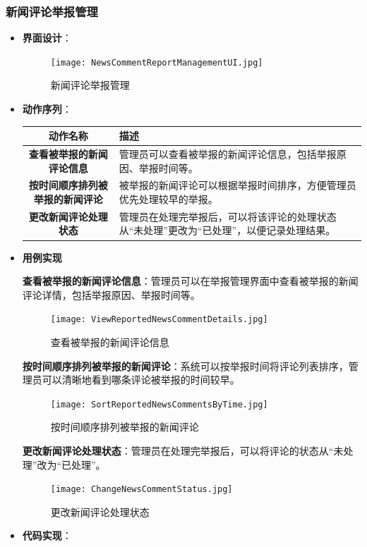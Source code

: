 \subsubsection{新闻评论举报管理}

\begin{itemize}
	\item \textbf{界面设计}：
	\begin{figure}[H]
		\centering
		\texttt{[image: NewsCommentReportManagementUI.jpg]}
		\caption{新闻评论举报管理}
	\end{figure}
	\item \textbf{动作序列}：
	\begin{table}[H]
		\centering
		\renewcommand\arraystretch{1.5}
		\begin{tabular}{|c|>{\raggedright\arraybackslash}p{10cm}|}
			\hline
			\textbf{动作名称} & \textbf{描述} \\ \hline
			\textbf{查看被举报的新闻评论信息} & 管理员可以查看被举报的新闻评论信息，包括举报原因、举报时间等。\\ \hline
			\textbf{按时间顺序排列被举报的新闻评论} & 被举报的新闻评论可以根据举报时间排序，方便管理员优先处理较早的举报。\\ \hline
			\textbf{更改新闻评论处理状态} & 管理员在处理完举报后，可以将该评论的处理状态从“未处理”更改为“已处理”，以便记录处理结果。\\ \hline
		\end{tabular}
	\end{table}
	
	\item \textbf{用例实现}
	
	\textbf{查看被举报的新闻评论信息}：管理员可以在举报管理界面中查看被举报的新闻评论详情，包括举报原因、举报时间等。
	
	\begin{figure}[H]
		\centering
		\texttt{[image: ViewReportedNewsCommentDetails.jpg]}
		\caption{查看被举报的新闻评论信息}
	\end{figure}
	
	\textbf{按时间顺序排列被举报的新闻评论}：系统可以按举报时间将评论列表排序，管理员可以清晰地看到哪条评论被举报的时间较早。
	
	\begin{figure}[H]
		\centering
		\texttt{[image: SortReportedNewsCommentsByTime.jpg]}
		\caption{按时间顺序排列被举报的新闻评论}
	\end{figure}
	
	\textbf{更改新闻评论处理状态}：管理员在处理完举报后，可以将评论的状态从“未处理”改为“已处理”。
	
	\begin{figure}[H]
		\centering
		\texttt{[image: ChangeNewsCommentStatus.jpg]}
		\caption{更改新闻评论处理状态}
	\end{figure}
	
	\item \textbf{代码实现}：
	
\end{itemize}

